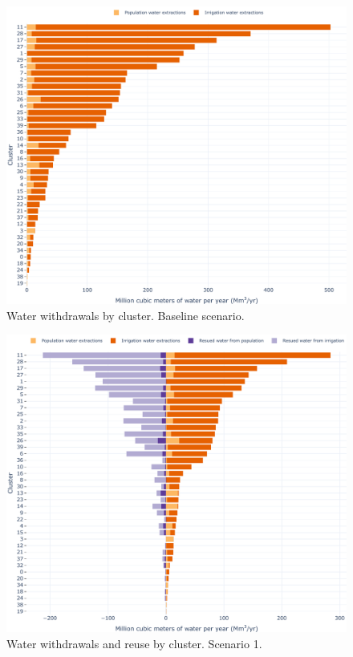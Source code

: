 \documentclass[12pt]{iopart}
\begin{document}
\begin{figure}[!h]
	\centering
	\includegraphics[width=\textwidth]{BaselineWater}
	\caption{Water withdrawals by cluster. Baseline scenario.}
	\label{fig:BaselineWater}
\end{figure}

\begin{figure}[!h]
	\centering
	\includegraphics[width=\textwidth]{BaselineWaterWithReuse}
	\caption{Water withdrawals and reuse by cluster. Scenario 1.}
	\label{fig:BaselineWaterReuse}
\end{figure}
\end{document}
